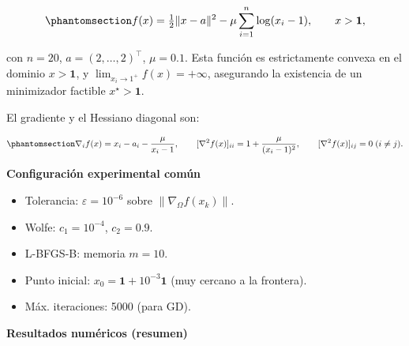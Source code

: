 \documentclass[
  spanish,
  us-letterpaper,
]{scrreprt}
\providecommand{\tightlist}{%
  \setlength{\itemsep}{0pt}\setlength{\parskip}{0pt}}
\numberwithin{equation}{section}
\begin{document}
\begin{equation}\phantomsection\label{eq-111}{
f(x) = \tfrac{1}{2}\|x-a\|^2 - \mu\sum_{i=1}^n \log(x_i - 1),\qquad x > \mathbf{1},
}\end{equation}

con \(n=20\), \(a=(2,\dots,2)^\top\), \(\mu=0.1\). Esta función es
estrictamente convexa en el dominio \(x>\mathbf{1}\), y
\(\lim_{x_i\to 1^+}f(x)=+\infty\), asegurando la existencia de un
minimizador factible \(x^\star> \mathbf{1}\).

El gradiente y el Hessiano diagonal son:

\begin{equation}\phantomsection\label{eq-112}{
\nabla_i f(x) = x_i - a_i - \frac{\mu}{x_i - 1},
\qquad
[\nabla^2 f(x)]_{ii} = 1 + \frac{\mu}{(x_i - 1)^2},\qquad
[\nabla^2 f(x)]_{ij}=0\;(i\ne j).
}\end{equation}

\textbf{Configuración experimental común}

\begin{itemize}
\tightlist
\item
  Tolerancia: \(\varepsilon = 10^{-6}\) sobre
  \(\|\nabla_\Omega f(x_k)\|\).\\
\item
  Wolfe: \(c_1=10^{-4}\), \(c_2=0.9\).\\
\item
  L-BFGS-B: memoria \(m=10\).\\
\item
  Punto inicial: \(x_0 = \mathbf{1} + 10^{-3}\mathbf{1}\) (muy cercano a
  la frontera).\\
\item
  Máx. iteraciones: 5000 (para GD).
\end{itemize}

\textbf{Resultados numéricos (resumen)}
\end{document}
